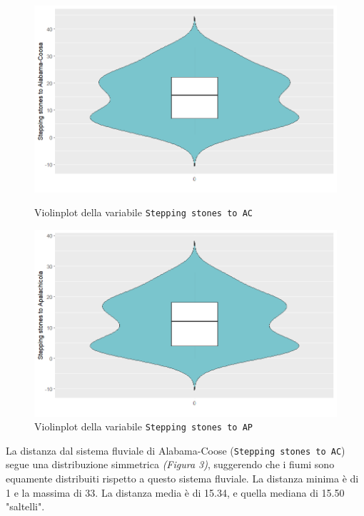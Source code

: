 \documentclass{article} %
\begin{document}
\begin{figure}[H]
    \centering
    \begin{minipage}{0.49\textwidth}
        \centering
        \includegraphics[width=\textwidth]{immagini/vp_ac.png}
        \captionsetup{justification=centering}
        \caption{Violinplot della variabile \texttt{Stepping stones to AC}}
    \end{minipage}
    \hfill
    \begin{minipage}{0.49\textwidth}
        \centering
        \includegraphics[width=\textwidth]{immagini/vp_ap.png}
        \captionsetup{justification=centering}
        \caption{Violinplot della variabile \texttt{Stepping stones to AP}}
    \end{minipage}
\end{figure}
La distanza dal sistema fluviale di Alabama-Coose (\texttt{Stepping stones to AC}) segue una distribuzione simmetrica \textit{(Figura 3)}, suggerendo che i fiumi sono equamente distribuiti rispetto a questo sistema fluviale. La distanza minima è di 1 e la massima di 33. La distanza media è di 15.34, e quella mediana di 15.50 "saltelli".
\end{document}
